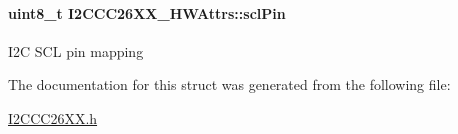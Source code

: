 \paragraph[{scl\-Pin}]{\setlength{\rightskip}{0pt plus 5cm}uint8\-\_\-t I2\-C\-C\-C26\-X\-X\-\_\-\-H\-W\-Attrs\-::scl\-Pin}\label{struct_i2_c_c_c26_x_x___h_w_attrs_a05531669bc614278c181e2720499f1b6}
I2\-C S\-C\-L pin mapping 

The documentation for this struct was generated from the following file\-:\begin{DoxyCompactItemize}
\item 
\hyperlink{_i2_c_c_c26_x_x_8h}{I2\-C\-C\-C26\-X\-X.\-h}\end{DoxyCompactItemize}
